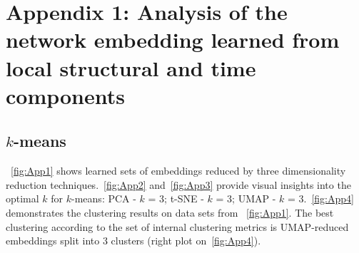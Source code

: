 \chapter{Appendix 1: Analysis of the network embedding learned from local structural and time components}
\label{appendix:k-means_time}

\section{$k$-means}
~\autoref{fig:App1} shows learned sets of embeddings reduced by three dimensionality reduction techniques.~\autoref{fig:App2} and~\autoref{fig:App3} provide visual insights into the optimal $k$ for $k$-means: PCA - $k$ = 3; t-SNE - $k$ = 3; UMAP - $k$ = 3.~\autoref{fig:App4} demonstrates the clustering results on data sets from ~\autoref{fig:App1}. The best clustering according to the set of internal clustering metrics is UMAP-reduced embeddings split into 3 clusters (right plot on~\autoref{fig:App4}).

